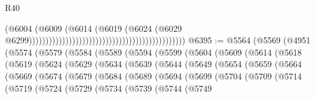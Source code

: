 \begin{lexlean}{R40}
\begin{coremodule}
                                                                                      (@6004
                                                                                        (@6009
                                                                                          (@6014
                                                                                            (@6019
                                                                                              (@6024
                                                                                                (@6029
                                                                                                  @6299)))))))))))))))))))))))))))))))))))))))))))))))
@6395 := @5564
    (@5569
      (@4951
        (@5574
          (@5579
            (@5584
              (@5589
                (@5594
                  (@5599
                    (@5604
                      (@5609
                        (@5614
                          (@5618
                            (@5619
                              (@5624
                                (@5629
                                  (@5634
                                    (@5639
                                      (@5644
                                        (@5649
                                          (@5654
                                            (@5659
                                              (@5664
                                                (@5669
                                                  (@5674
                                                    (@5679
                                                      (@5684
                                                        (@5689
                                                          (@5694
                                                            (@5699
                                                              (@5704
                                                                (@5709
                                                                  (@5714
                                                                    (@5719
                                                                      (@5724
                                                                        (@5729
                                                                          (@5734
                                                                            (@5739
                                                                              (@5744
                                                                                (@5749

\end{coremodule}
\end{lexlean}
